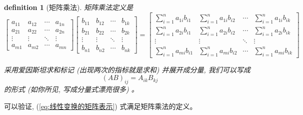 \documentclass{ctexart}
\newtheorem{definition}{definition}
\begin{document}
    \begin{definition}
        [矩阵乘法] 矩阵乘法定义是
        \begin{equation}
            \begin{bmatrix}
                a_{11} & a_{12} & \cdots & a_{1n} \\
                a_{21} & a_{22} & \cdots & a_{2n} \\
                \vdots & \vdots & \ddots & \vdots \\
                a_{m1} & a_{m2} & \cdots & a_{mn}
            \end{bmatrix} \begin{bmatrix}
                b_{11} & b_{12} & \cdots & b_{1k} \\
                b_{21} & b_{22} & \cdots & b_{2k} \\
                \vdots & \vdots & \ddots & \vdots \\
                b_{n1} & b_{n2} & \cdots & b_{nk}
            \end{bmatrix} = \begin{bmatrix}
                \sum_{i=1}^{n} a_{1i}b_{i1} & \sum_{i=1}^{n} a_{1i}b_{i2} & \cdots & \sum_{i=1}^{n} a_{1i}b_{ik} \\
                \sum_{i=1}^{n} a_{2i}b_{i1} & \sum_{i=1}^{n} a_{2i}b_{i2} & \cdots & \sum_{i=1}^{n} a_{2i}b_{ik} \\
                \vdots & \vdots & \ddots & \vdots \\
                \sum_{i=1}^{n} a_{mi}b_{i1} & \sum_{i=1}^{n} a_{mi}b_{i2} & \cdots & \sum_{i=1}^{n} a_{mi}b_{ik}
            \end{bmatrix}
        \end{equation}
        
        采用爱因斯坦求和标记 (出现两次的指标就是求和) 并展开成分量, 我们可以写成
        \begin{equation}
            \label {eq:矩阵乘法}
            {(AB)}_{ij} = A_{ik}B_{kj}
        \end{equation}
        的形式 (如你所见, 写成分量式漂亮很多) 。
    \end{definition}

    可以验证, (\ref{eq:线性变换的矩阵表示}) 式满足矩阵乘法的定义。
\end{document}
